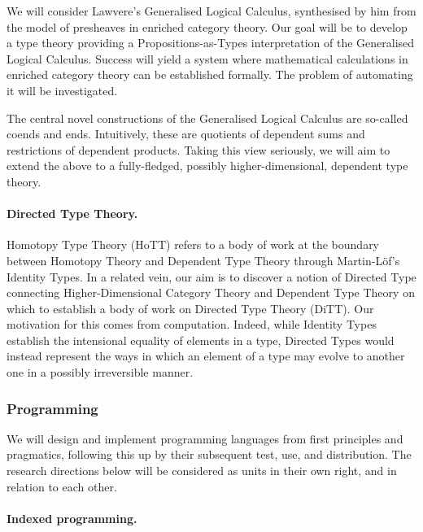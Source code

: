 \documentclass[11pt,twocolumn]{article}
\newcommand{\hl}[1]{#1}%
\begin{document}
We will consider Lawvere's Generalised Logical Calculus, %
synthesised by him from the model of presheaves in enriched category theory.
Our \hl{goal} will be to develop a type theory providing a
Propositions-as-Types interpretation of the Generalised Logical Calculus.
Success will yield a system where mathematical calculations in enriched
category theory can be established formally.  The problem of automating it
will be investigated.

The central novel constructions of the Generalised Logical Calculus are
so-called coends and ends.  Intuitively, these are quotients of dependent sums
and restrictions of dependent products.  Taking this view seriously, we will
\hl{aim} to extend the above to a fully-fledged, possibly
higher-dimensional, dependent type theory.  

\paragraph{Directed Type Theory.}
\label{DirectedTypeTheoryParagraph}

Homotopy Type Theory (HoTT) refers to a body of work at the boundary between
Homotopy Theory and Dependent Type Theory through Martin-L\"of's Identity
Types. %
In a related vein, our \hl{aim} is to discover a notion of Directed Type
connecting Higher-Dimensional Category Theory and Dependent Type Theory on
which to establish a body of work on Directed Type Theory (DiTT).  Our
\hl{motivation} for this comes from computation.  Indeed, while Identity
Types establish the intensional equality of elements in a type, Directed Types
would instead represent the ways in which an element of a type may evolve to
another one in a possibly irreversible manner.  

\subsubsection{Programming}
\label{Programming}

We will design and implement programming languages from first principles and
pragmatics, following this up by their subsequent test, use, and distribution.
The research directions below will be considered as units in their own right,
and in relation to each other.

\paragraph{Indexed programming.}
\label{IndexedProgrammingParagraph}
\end{document}
